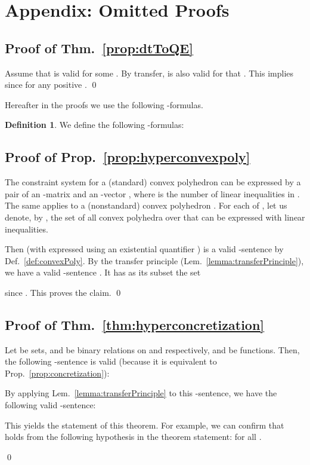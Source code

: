 \documentclass[envcountsect,orivec]{llncs} \pdfoutput=1
\theoremstyle{definition}
\newtheorem{mydef}[mythm]{Definition}
\def\myqed{\qed}
\begin{document}
\section{Appendix: Omitted Proofs}\label{appendix:omittedProofs}




\subsection{Proof of Thm.~\ref{prop:dtToQE}}
\begin{myproof}
Assume that  is valid for some .
By transfer,  is also valid for that .
This implies  since  for any positive .
\myqed
\end{myproof}







Hereafter in the proofs we use the following -formulas.


\begin{mydef}\label{def:lunotations}
We define the following -formulas:
 
\end{mydef}

\subsection{Proof of Prop.~\ref{prop:hyperconvexpoly}}
\begin{myproof}
The constraint system  for a (standard) convex polyhedron  can be expressed by a pair  of an -matrix  and an -vector , where 
 is the number of linear inequalities in .
 The same applies to a (nonstandard) convex polyhedron
 .
 For each of ,  let us denote,
 by , the set of all
 convex polyhedra  over  that can be expressed with  linear inequalities.



Then  (with 
 expressed using an existential quantifier ) is a valid -sentence by Def.~\ref{def:convexPoly}.
By the transfer principle (Lem.~\ref{lemma:transferPrinciple}), we have a valid -sentence .
It has as its subset the set
 
since . This proves the claim.
\myqed
\end{myproof}


\subsection{Proof of Thm.~\ref{thm:hyperconcretization}}
\begin{myproof}
 Let  be sets,  and  be binary relations on  and  respectively,  and  be functions.
 Then, the following -sentence is valid (because it is equivalent to Prop.~\ref{prop:concretization}):
 
By applying Lem.~\ref{lemma:transferPrinciple} to this -sentence, we have the following valid -sentence:
 
This yields the statement of this theorem. 
For example, we can confirm that  holds from the following hypothesis in the theorem statement:
  for all .




\myqed
\end{myproof}
\end{document}
